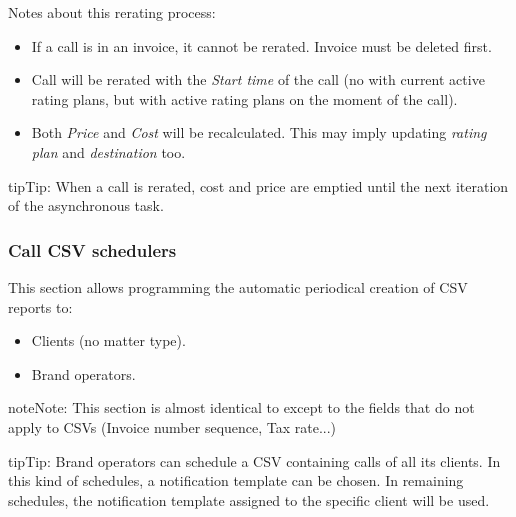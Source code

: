 \documentclass[letterpaper,10pt,english]{sphinxmanual}
\begin{document}
Notes about this rerating process:
\begin{itemize}
\item {} 
If a call is in an invoice, it cannot be rerated. Invoice must be deleted first.

\item {} 
Call will be rerated with the \emph{Start time} of the call (no with current active rating plans, but with active rating plans
on the moment of the call).

\item {} 
Both \emph{Price} and \emph{Cost} will be recalculated. This may imply updating \emph{rating plan} and \emph{destination} too.

\end{itemize}

\begin{notice}{tip}{Tip:}
When a call is rerated, cost and price are emptied until the next iteration of the asynchronous task.
\end{notice}


\subsubsection{Call CSV schedulers}
\label{administration_portal/client/wholesale/calls/call_csv_schedulers:call-csv-schedulers}\label{administration_portal/client/wholesale/calls/call_csv_schedulers::doc}
This section allows programming the automatic periodical creation of CSV reports to:
\begin{itemize}
\item {} 
Clients (no matter type).

\item {} 
Brand operators.

\end{itemize}

\begin{notice}{note}{Note:}
This section is almost identical to {\hyperref[administration_portal/brand/invoicing/invoice_schedulers:invoice\string-schedulers]{}} except to the
fields that do not apply to CSVs (Invoice number sequence, Tax rate...)
\end{notice}

\begin{notice}{tip}{Tip:}
Brand operators can schedule a CSV containing calls of all its clients.
In this kind of schedules, a notification template can be chosen. In remaining
schedules, the notification template assigned to the specific client will be used.
\end{notice}
\end{document}
